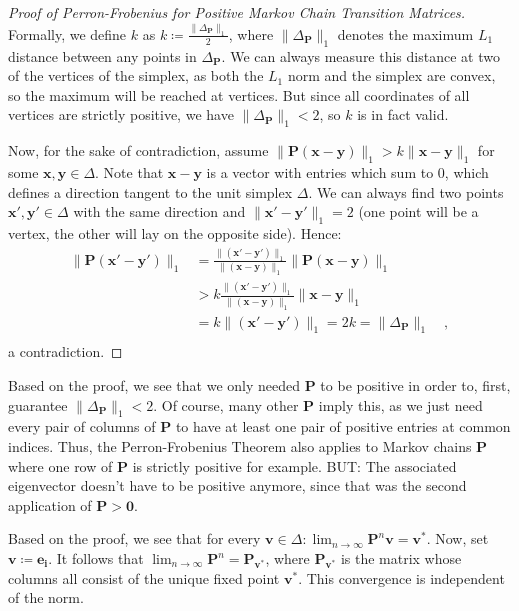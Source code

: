 \documentclass[../../main.tex]{subfiles}
\begin{document}
\begin{proof}[Proof of Perron-Frobenius for Positive Markov Chain Transition Matrices]
    Formally, we define $k$ as $k \coloneqq \frac{\|\Delta_{\bm{P}}\|_1}{2}$, where $\|\Delta_{\bm{P}}\|_1$ denotes the maximum $L_1$ distance between any points in $\Delta_{\bm{P}}$. We can always measure this distance at two of the vertices of the simplex, as both the $L_1$ norm and the simplex are convex, so the maximum will be reached at vertices. But since all coordinates of all vertices are strictly positive, we have $\|\Delta_{\bm{P}}\|_1 < 2$, so $k$ is in fact valid.

    Now, for the sake of contradiction, assume $\|\bm{P} (\bm{x} - \bm{y})\|_1 > k \|\bm{x} - \bm{y}\|_1$ for some $\bm{x}, \bm{y} \in \Delta$. Note that $\bm{x} - \bm{y}$ is a vector with entries which sum to $0$, which defines a direction tangent to the unit simplex $\Delta$. We can always find two points $\bm{x}', \bm{y}' \in \Delta$ with the same direction and $\|\bm{x}' - \bm{y}'\|_1 = 2$ (one point will be a vertex, the other will lay on the opposite side). Hence:
    \begin{align*}
        \|\bm{P} (\bm{x}' - \bm{y}')\|_1 &= \frac{\|(\bm{x}' - \bm{y}')\|_1}{\|(\bm{x} - \bm{y})\|_1} \|\bm{P} (\bm{x} - \bm{y})\|_1 \\
        &> k \frac{\|(\bm{x}' - \bm{y}')\|_1}{\|(\bm{x} - \bm{y})\|_1} \|\bm{x} - \bm{y}\|_1 \\
        &= k \|(\bm{x}' - \bm{y}')\|_1 = 2k = \|\Delta_{\bm{P}}\|_1 \quad , \\
    \end{align*}
    a contradiction.
\end{proof}

\begin{corollary}
    \label{corollary:perron_frobenius_extension}
    Based on the proof, we see that we only needed $\bm{P}$ to be positive in order to, first, guarantee $\|\Delta_{\bm{P}}\|_1 < 2$. Of course, many other $\bm{P}$ imply this, as we just need every pair of columns of $\bm{P}$ to have at least one pair of positive entries at common indices. Thus, the Perron-Frobenius Theorem also applies to Markov chains $\bm{P}$ where one row of $\bm{P}$ is strictly positive for example. BUT: The associated eigenvector doesn't have to be positive anymore, since that was the second application of $\bm{P} > \bm{0}$.
\end{corollary}

\begin{corollary}
    Based on the proof, we see that for every $\bm{v} \in \Delta: \lim_{n \to \infty} \bm{P}^n \bm{v} = \bm{v}^*$. Now, set $\bm{v} \coloneqq \bm{e_i}$. It follows that $\lim_{n \to \infty} \bm{P}^n = \bm{P}_{\bm{v}^*}$, where $\bm{P}_{\bm{v}^*}$ is the matrix whose columns all consist of the unique fixed point $\bm{v}^*$. This convergence is independent of the norm.
\end{corollary}
\end{document}
